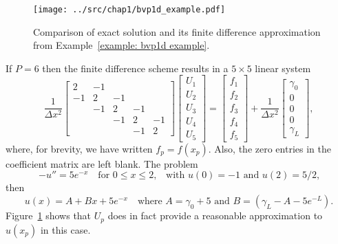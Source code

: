 \begin{figure}
\caption{Comparison of exact solution and its finite difference approximation
from Example~\ref{example: bvp1d example}.}\label{fig: bvp1d example}
\begin{center}
\texttt{[image: ../src/chap1/bvp1d\_example.pdf]}
\end{center}
\end{figure}

\begin{example}\label{example: bvp1d example}
If $P=6$ then the finite difference scheme results in a $5\times5$ 
linear system
\begin{equation}\label{eq: model 1d linear system}
\frac{1}{\Delta x^2}\begin{bmatrix}
 2&-1&  & &\\
-1& 2&-1& &\\
  &-1& 2&-1&\\
  &  &-1& 2&-1\\
  &  &  &-1& 2
\end{bmatrix}
\begin{bmatrix}U_1\\ U_2\\ U_3\\ U_4\\ U_5\end{bmatrix}
=\begin{bmatrix}f_1\\ f_2\\ f_3\\ f_4\\ f_5 \end{bmatrix}
+\frac{1}{\Delta x^2}
\begin{bmatrix}\gamma_0\\ 0\\ 0 \\ 0\\ \gamma_L \end{bmatrix},
\end{equation}
where, for brevity, we have written $f_p=f(x_p)$.  Also, the zero entries in 
the coefficient matrix are left blank.  The problem
\[
-u''=5e^{-x}\quad\text{for $0\le x\le2$,}
    \quad\text{with $u(0)=-1$ and $u(2)=5/2$,}
\]
then 
\[
u(x)=A+Bx+5e^{-x}\quad
\text{where $A=\gamma_0+5$ and $B=(\gamma_L-A-5e^{-L})$.}
\]
Figure~\ref{fig: bvp1d example} shows that $U_p$ does in fact provide a 
reasonable approximation to~$u(x_p)$ in this case.
\end{example}

